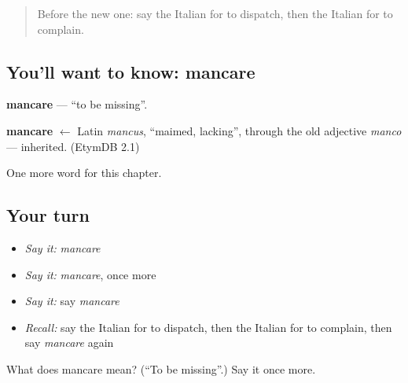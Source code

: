 \begin{quote}
Before the new one: say the Italian for to dispatch, then the Italian for to complain.
\end{quote}

\subsection*{You'll want to know: mancare}
\textbf{mancare} — \textquotedblleft{}to be missing\textquotedblright{}.

\begin{cousinweb}
\textbf{mancare} $\leftarrow$ Latin \emph{mancus}, \textquotedblleft{}maimed, lacking\textquotedblright{}, through the old adjective \emph{manco} — inherited. (EtymDB 2.1)
\end{cousinweb}

\begin{grammarlens}[title={What you've built}]
One more word for this chapter.
\end{grammarlens}

\subsection*{Your turn}
\begin{itemize}
\raggedright
  \item \emph{Say it:} \emph{mancare}
  \item \emph{Say it:} \emph{mancare}, once more
  \item \emph{Say it:} say \emph{mancare}
  \item \emph{Recall:} say the Italian for to dispatch, then the Italian for to complain, then say \emph{mancare} again
\end{itemize}

\begin{tcolorbox}[breakable,colback=teal!4,colframe=teal!35!black,title={Before you move on}]
What does mancare mean? (\textquotedblleft{}To be missing\textquotedblright{}.) Say it once more.
\end{tcolorbox}

